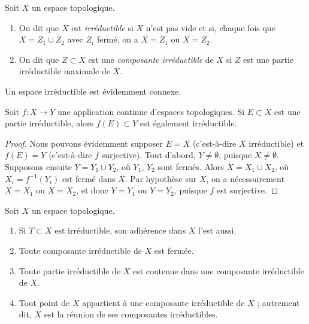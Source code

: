 \begin{definition}
\label{definition-irreducible-components}
Soit $X$ un espace topologique.
\begin{enumerate}
\item On dit que $X$ est {\it irréductible} si $X$ n'est pas vide et si,
chaque fois que $X = Z_1 \cup Z_2$ avec $Z_i$ fermé, on a $X = Z_1$ ou
$X = Z_2$.
\item On dit que $Z \subset X$ est une {\it composante irréductible} de $X$
si $Z$ est une partie irréductible maximale de $X$.
\end{enumerate}
\end{definition}

\noindent
Un espace irréductible est évidemment connexe.

\begin{lemma}
\label{lemma-image-irreducible-space}
Soit $f : X \to Y$ une application continue d'espaces topologiques.
Si $E \subset X$ est une partie irréductible, alors $f(E) \subset Y$ est
également irréductible.
\end{lemma}

\begin{proof}
Nous pouvons évidemment supposer $E = X$ (c'est-à-dire $X$ irréductible) et
$f(E) = Y$ (c'est-à-dire $f$ surjective). Tout d'abord,
$Y \not = \emptyset$, puisque $X \not = \emptyset$. Supposons ensuite
$Y = Y_1 \cup Y_2$, où $Y_1$, $Y_2$ sont fermés. Alors
$X = X_1 \cup X_2$, où $X_i = f^{-1}(Y_i)$ est fermé dans $X$. Par hypothèse
sur $X$, on a nécessairement $X = X_1$ ou $X = X_2$, et donc $Y = Y_1$ ou
$Y = Y_2$, puisque $f$ est surjective.
\end{proof}

\begin{lemma}
\label{lemma-irreducible}
Soit $X$ un espace topologique.
\begin{enumerate}
\item Si $T \subset X$ est irréductible, son adhérence dans $X$ l'est aussi.
\item Toute composante irréductible de $X$ est fermée.
\item Toute partie irréductible de $X$ est contenue dans une composante
irréductible de $X$.
\item Tout point de $X$ appartient à une composante irréductible de $X$ ;
autrement dit, $X$ est la réunion de ses composantes irréductibles.
\end{enumerate}
\end{lemma}

